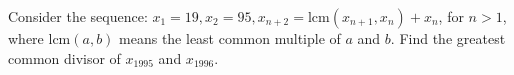 Consider the sequence: $x_1=19,x_2=95,x_{n+2}=\text{lcm} (x_{n+1},x_n)+x_n$,  for $n>1$,  where $\text{lcm} (a,b)$ means the least common multiple of $a$ and $b$. Find the greatest common divisor of $x_{1995}$ and $x_{1996}$.